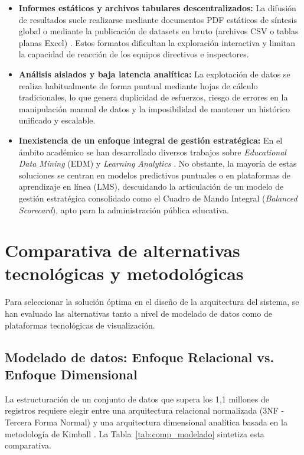 \documentclass[12pt, a4paper, twoside]{report}
\begin{document}
\begin{itemize}
    \item \textbf{Informes estáticos y archivos tabulares descentralizados:} La difusión de resultados suele realizarse mediante documentos PDF estáticos de síntesis global o mediante la publicación de datasets en bruto (archivos CSV o tablas planas Excel) \cite{transparencia_catalunya_2024}. Estos formatos dificultan la exploración interactiva y limitan la capacidad de reacción de los equipos directivos e inspectores.
    \item \textbf{Análisis aislados y baja latencia analítica:} La explotación de datos se realiza habitualmente de forma puntual mediante hojas de cálculo tradicionales, lo que genera duplicidad de esfuerzos, riesgo de errores en la manipulación manual de datos y la imposibilidad de mantener un histórico unificado y escalable.
    \item \textbf{Inexistencia de un enfoque integral de gestión estratégica:} En el ámbito académico se han desarrollado diversos trabajos sobre \textit{Educational Data Mining} (EDM) y \textit{Learning Analytics} \cite{romero2010educational}. No obstante, la mayoría de estas soluciones se centran en modelos predictivos puntuales o en plataformas de aprendizaje en línea (LMS), descuidando la articulación de un modelo de gestión estratégica consolidado como el Cuadro de Mando Integral (\textit{Balanced Scorecard}), apto para la administración pública educativa.
\end{itemize}

\section{Comparativa de alternativas tecnológicas y metodológicas}
Para seleccionar la solución óptima en el diseño de la arquitectura del sistema, se han evaluado las alternativas tanto a nivel de modelado de datos como de plataformas tecnológicas de visualización.

\subsection{Modelado de datos: Enfoque Relacional vs. Enfoque Dimensional}
La estructuración de un conjunto de datos que supera los 1,1 millones de registros requiere elegir entre una arquitectura relacional normalizada (3NF - Tercera Forma Normal) y una arquitectura dimensional analítica basada en la metodología de Kimball \cite{kimball2013data}. La Tabla~\ref{tab:comp_modelado} sintetiza esta comparativa.
\end{document}
